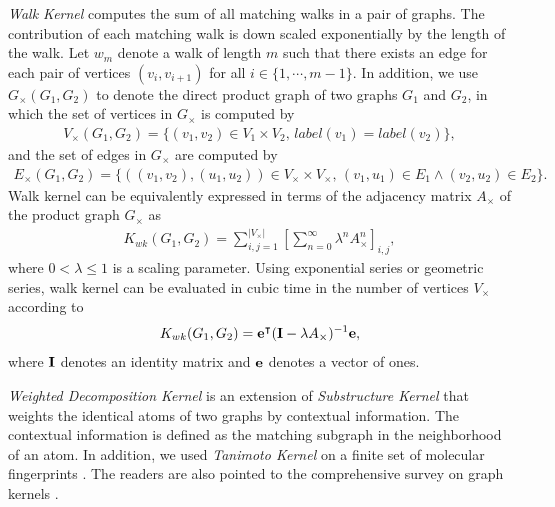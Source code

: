 {%
\textit{Walk Kernel} \citep{Kashima03marginalized,Gartner03a} computes the sum of all matching walks in a pair of graphs. 
The contribution of each matching walk is down scaled exponentially by the length of the walk.
Let $w_m$ denote a walk of length $m$ such that there exists an edge for each pair of vertices $(v_i,v_{i+1})$ for all $i\in\{1,\cdots,m-1\}$.
In addition, we use $G_{\times}(G_1,G_2)$ to denote the direct product graph of two graphs $G_1$ and $G_2$, in which the set of vertices in $G_{\times}$ is computed by 
\begin{align*}
	V_{\times}(G_1,G_2) = \{(v_1,v_2)\in V_1\times V_2,\, label(v_1)=label(v_2)\},
\end{align*}
and the set of edges in $G_{\times}$ are computed by
\begin{align*}
	E_{\times}(G_1,G_2) = \{((v_1,v_2),(u_1,u_2))\in V_{\times}\times V_{\times},\, (v_1,u_1)\in E_1\wedge (v_2,u_2)\in E_2\}.
\end{align*}
Walk kernel can be equivalently expressed in terms of the adjacency matrix $A_{\times}$ of the product graph $G_{\times}$ as
\begin{align*}
	K_{wk}(G_1,G_2) = \sum_{i,j=1}^{|V_{\times}|}\left[\sum_{n=0}^{\infty}\lambda^{n}A_{\times}^n\right]_{i,j},
\end{align*}
where $0<\lambda\le1$ is a scaling parameter.
Using exponential series or geometric series, walk kernel can be evaluated in cubic time \citep{Gartner03a} in the number of vertices $V_{\times}$ according to
\begin{align*}
	K_{wk}(G_1,G_2) = \mathbf {e}^{\intercal}(\mathbf{I}-\lambda A_{\times})^{-1}\mathbf {e},
\end{align*}
where $\mathbf{I}$ denotes an identity matrix and $\mathbf {e}$ denotes a vector of ones.

\textit{Weighted Decomposition Kernel} \citep{Menchetti05weighted,Ceroni08classification} is an extension of \textit{Substructure Kernel} \citep{Haussler99convolution} that weights the identical atoms of two graphs by contextual information.
The contextual information is defined as the matching subgraph in the neighborhood of an atom.
In addition, we used \textit{Tanimoto Kernel} \citep{Ralaivola05graph} on a finite set of molecular fingerprints \citep{Wang09pubchem}.
The readers are also pointed to the comprehensive survey on graph kernels \citep{Vishwanathan10graph}.

}
